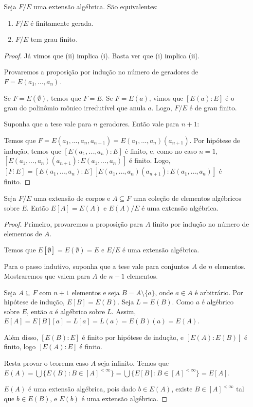 \begin{prop}
Seja $F/E$ uma extensão algébrica. São equivalentes:

\begin{enumerate}[label=(\roman*)]
    \item $F/E$ é finitamente gerada.
    \item $F/E$ tem grau finito.
\end{enumerate}
\end{prop}
\begin{proof}
    Já vimos que (ii) implica (i). Basta ver que (i) implica (ii).

    Provaremos a proposição por indução no número de geradores de $F=E(a_1, \dots, a_n)$.

    Se $F=E(\emptyset)$, temos que $F=E$.
    Se $F=E(a)$, vimos que $[E(a):E]$ é o grau do polinômio mônico irredutível que anula $a$. Logo, $F/E$ é de grau finito.

    Suponha que a tese vale para $n$ geradores. Então vale para $n+1$:

    Temos que $F=E(a_1, \dots, a_n, a_{n+1})=E(a_1, \dots, a_n)(a_{n+1})$.
    Por hipótese de indução, temos que $[E(a_1, \dots, a_n):E]$ é finito, e, como no caso $n=1$, $[E(a_1, \dots, a_n)(a_{n+1}):E(a_1, \dots, a_n)]$ é finito.
    Logo, $[F:E]=[E(a_1, \dots, a_n):E][E(a_1, \dots, a_n)(a_{n+1}):E(a_1, \dots, a_n)]$ é finito.
\end{proof}



\begin{prop}
    Seja $F/E$ uma extensão de corpos e $A\subseteq F$ uma coleção de elementos algébricos sobre $E$.
    Então $E[A]=E(A)$ e $E(A)/E$ é uma extensão algébrica.
\end{prop}

\begin{proof}
    Primeiro, provaremos a proposição para $A$ finito por indução no número de elementos de $A$.

    Temos que $E[\emptyset]=E(\emptyset)=E$ e $E/E$ é uma extensão algébrica.

    Para o passo indutivo, suponha que a tese vale para conjuntos $A$ de $n$ elementos. Mostraremos que valem para $A$ de $n+1$ elementos.

    Seja $A\subseteq F$ com $n+1$ elementos e seja $B=A\setminus \{a\}$, onde $a \in A$ é arbitrário.
    Por hipótese de indução, $E[B]=E(B)$.
    Seja $L=E(B)$. Como $a$ é algébrico sobre $E$, então $a$ é algébrico sobre $L$.
    Assim, $E[A]=E[B][a]=L[a]=L(a)=E(B)(a)=E(A)$.
    
    Além disso, $[E(B):E]$ é finito por hipótese de indução, e $[E(A):E(B)]$ é finito, logo $[E(A):E]$ é finito.


    Resta provar o teorema caso $A$ seja infinito.
    Temos que $E(A)=\bigcup\{E(B): B \in [A]^{<\infty}\}=\bigcup\{E[B]: B \in [A]^{<\infty}\}=E[A]$.

    $E(A)$ é uma extensão algébrica, pois dado $b \in E(A)$, existe $B\in [A]^{<\infty}$ tal que $b \in E(B)$, e $E(b)$ é uma extensão algébrica.
\end{proof}

